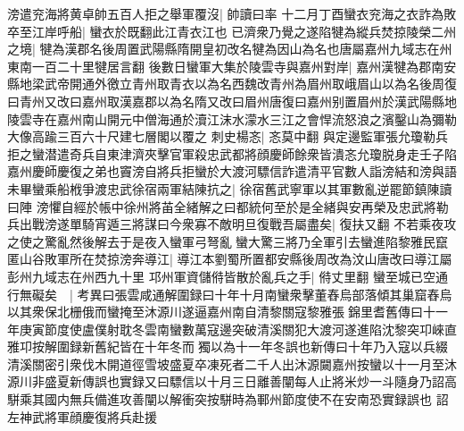 滂遣兖海將黄卓帥五百人拒之舉軍覆沒|{
	帥讀曰率}
十二月丁酉蠻衣兖海之衣詐為敗卒至江岸呼船|{
	蠻衣於既翻此江青衣江也}
已濟衆乃覺之遂陷犍為縱兵焚掠陵榮二州之境|{
	犍為漢郡名後周置武陽縣隋開皇初改名犍為因山為名也唐屬嘉州九域志在州東南一百二十里犍居言翻}
後數日蠻軍大集於陵雲寺與嘉州對岸|{
	嘉州漢犍為郡南安縣地梁武帝開通外徼立青州取青衣以為名西魏改青州為眉州取峨眉山以為名後周復曰青州又改曰嘉州取漢嘉郡以為名隋又改曰眉州唐復曰嘉州别置眉州於漢武陽縣地陵雲寺在嘉州南山開元中僧海通於瀆江沫水濛水三江之會悍流怒浪之濱鑿山為彌勒大像高踰三百六十尺建七層閣以覆之}
刺史楊忞|{
	忞莫中翻}
與定邊監軍張允瓊勒兵拒之蠻潜遣奇兵自東津濟夾擊官軍殺忠武都將顔慶師餘衆皆潰忞允瓊脱身走壬子陷嘉州慶師慶復之弟也竇滂自將兵拒蠻於大渡河驃信詐遣清平官數人詣滂結和滂與語未畢蠻乘船栰爭渡忠武徐宿兩軍結陳抗之|{
	徐宿舊武寧軍以其軍數亂逆罷節鎮陳讀曰陣}
滂懼自經於帳中徐州將苖全緒解之曰都統何至於是全緒與安再榮及忠武將勒兵出戰滂遂單騎宵遁三將謀曰今衆寡不敵明旦復戰吾屬盡矣|{
	復扶又翻}
不若乘夜攻之使之驚亂然後解去于是夜入蠻軍弓弩亂蠻大驚三將乃全軍引去蠻進陷黎雅民竄匿山谷敗軍所在焚掠滂奔導江|{
	導江本劉蜀所置都安縣後周改為汶山唐改曰導江屬彭州九域志在州西九十里}
邛州軍資儲偫皆散於亂兵之手|{
	偫丈里翻}
蠻至城已空通行無礙矣　|{
	考異曰張雲咸通解圍録曰十年十月南蠻衆擊董舂烏部落傾其巢窟舂烏以其衆保北栅俄而蠻掩至沐源川遂逼嘉州南自清黎關寇黎雅張錦里耆舊傳曰十一年庚寅節度使盧僕射耽冬雲南蠻數萬寇邊突破清溪關犯大渡河遂進陷沈黎突卭崍直雅卭按解圍録新舊紀皆在十年冬而獨以為十一年冬誤也新傳曰十年乃入寇以兵綴清溪關密引衆伐木開道徑雪坡盛夏卒凍死者二千人出沐源闚嘉州按蠻以十一月至沐源川非盛夏新傳誤也實録又曰驃信以十月三日離善闡每人止將米炒一斗隨身乃詔高駢乘其國内無兵備進攻善闡以解衝突按駢時為鄆州節度使不在安南恐實録誤也}
詔左神武將軍顔慶復將兵赴援

